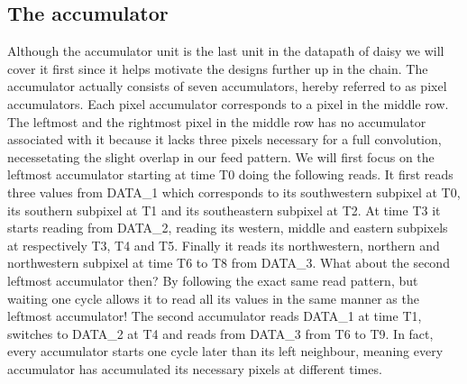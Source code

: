 \subsection{The accumulator}
Although the accumulator unit is the last unit in the datapath of daisy we will cover it first since it helps motivate the designs further up in the chain.
The accumulator actually consists of seven accumulators, hereby referred to as pixel accumulators. Each pixel accumulator corresponds to a pixel in the middle row.
The leftmost and the rightmost pixel in the middle row has no accumulator associated with it because it lacks three pixels necessary for a full convolution, necessetating the slight overlap in our feed pattern.
We will first focus on the leftmost accumulator starting at time T0 doing the following reads. 
It first reads three values from DATA\_1 which corresponds to its southwestern subpixel at T0, its southern subpixel at T1 and its southeastern subpixel at T2. 
At time T3 it starts reading from DATA\_2, reading its western, middle and eastern subpixels at respectively T3, T4 and T5. 
Finally it reads its northwestern, northern and northwestern subpixel at time T6 to T8 from DATA\_3.
What about the second leftmost accumulator then? By following the exact same read pattern, but waiting one cycle allows it to read all its values in the same manner as the leftmost accumulator!
The second accumulator reads DATA\_1 at time T1, switches to DATA\_2 at T4 and reads from DATA\_3 from T6 to T9. 
In fact, every accumulator starts one cycle later than its left neighbour, meaning every accumulator has accumulated its necessary pixels at different times.

